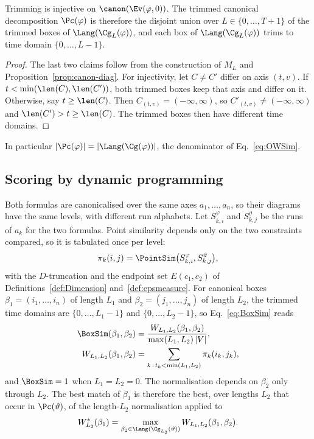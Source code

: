 \begin{lemma}[trimming]\label{lem:trim}
Trimming is injective on $\canon(\Ev(\varphi,0))$. The trimmed canonical
decomposition $\Pc(\varphi)$ is therefore the disjoint union over
$L\in\{0,\dots,T+1\}$ of the trimmed boxes of $\Lang(\Cg_L(\varphi))$, and
each box of $\Lang(\Cg_L(\varphi))$ trims to time domain $\{0,\dots,L-1\}$.
\end{lemma}

\begin{proof}
The last two claims follow from the construction of $M_L$ and
Proposition~\ref{prop:canon-diag}. For injectivity, let $C\neq C'$ differ on
axis $(t,v)$. If $t<\min(\len(C),\len(C'))$, both trimmed boxes keep that axis
and differ on it. Otherwise, say $t\ge\len(C)$. Then $C_{(t,v)}=(-\infty,\infty)$,
so $C'_{(t,v)}\neq(-\infty,\infty)$ and $\len(C')>t\ge\len(C)$. The trimmed
boxes then have different time domains.
\end{proof}

In particular $|\Pc(\varphi)|=|\Lang(\Cg(\varphi))|$, the denominator of
Eq.~\eqref{eq:OWSim}.

\subsection{Scoring by dynamic programming}\label{sec:method-score}

Both formulas are canonicalised over the same axes $a_1,\dots,a_n$, so their
diagrams have the same levels, with different run alphabets. Let
$S^{\varphi}_{k,i}$ and $S^{\vartheta}_{k,j}$ be the runs of $a_k$ for the two
formulas. Point similarity depends only on the two constraints compared, so
it is tabulated once per level:
\[
  \pi_k(i,j)=\PointSim\bigl(S^{\varphi}_{k,i},S^{\vartheta}_{k,j}\bigr),
\]
with the $D$-truncation and the endpoint set $E(c_1,c_2)$ of
Definitions~\ref{def:Dimension} and~\ref{def:epsmeasure}. For canonical boxes
$\beta_1=(i_1,\dots,i_n)$ of length $L_1$ and $\beta_2=(j_1,\dots,j_n)$ of
length $L_2$, the trimmed time domains are $\{0,\dots,L_1-1\}$ and
$\{0,\dots,L_2-1\}$, so Eq.~\eqref{eq:BoxSim} reads
\begin{equation}\label{eq:boxsim-len}
\begin{aligned}
  \BoxSim(\beta_1,\beta_2) &= \frac{W_{L_1,L_2}(\beta_1,\beta_2)}{\max(L_1,L_2)\,|V|},\\
  W_{L_1,L_2}(\beta_1,\beta_2) &= \sum_{k\,:\,t_k<\min(L_1,L_2)}\pi_k(i_k,j_k),
\end{aligned}
\end{equation}
and $\BoxSim=1$ when $L_1=L_2=0$. The normalisation depends on $\beta_2$ only
through $L_2$. The best match of $\beta_1$ is therefore the best, over lengths
$L_2$ that occur in $\Pc(\vartheta)$, of the length-$L_2$ normalisation applied
to
\[
  W^*_{L_2}(\beta_1)=\max_{\beta_2\in\Lang(\Cg_{L_2}(\vartheta))}W_{L_1,L_2}(\beta_1,\beta_2).
\]


